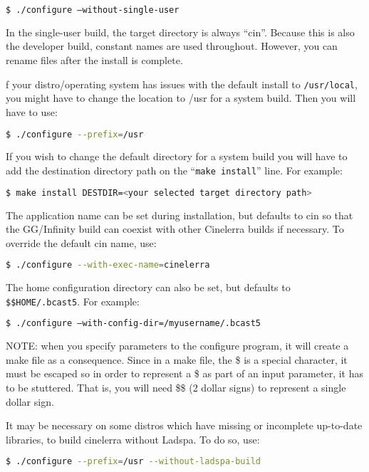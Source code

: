 \begin{lstlisting}[language=bash]
$ ./configure –without-single-user
\end{lstlisting}

In the single-user build, the target directory is always “cin”.  
Because this is also the developer build, constant names are used throughout.  
However, you can rename files after the install is complete.

f your distro/operating system has issues with the default install to \texttt{/usr/local}, you might have to change the location to /usr for a system build.  Then you will have to use:
\begin{lstlisting}[language=bash]
$ ./configure --prefix=/usr
\end{lstlisting}

If you wish to change the default directory for a system build you will have to add the destination directory path on the “\texttt{make install}” line.  For example:
\begin{lstlisting}[language=bash]
$ make install DESTDIR=<your selected target directory path>
\end{lstlisting}

The application name can be set during installation, but defaults to cin so that the GG/Infinity build can coexist with other Cinelerra builds if necessary.  To override the default cin name, use:	
\begin{lstlisting}[language=bash]
$ ./configure --with-exec-name=cinelerra
\end{lstlisting}

The home configuration directory can also be set, but defaults to \texttt{\$\$HOME/.bcast5}.  
For example:

\begin{lstlisting}[language=bash]
$ ./configure –with-config-dir=/myusername/.bcast5
\end{lstlisting}

NOTE:  when you specify parameters to the configure program, it will create a make file as a consequence.  
Since in a make file, the \$ is a special character, it must be escaped so in order to represent a \$ as part of an input parameter, it has to be stuttered.  
That is, you will need \$\$ (2 dollar signs) to represent a single dollar sign. 

It may be necessary on some distros which have missing or incomplete up-to-date libraries, to build cinelerra without Ladspa.  
To do so, use:

\begin{lstlisting}[language=bash]
$ ./configure --prefix=/usr --without-ladspa-build
\end{lstlisting}

